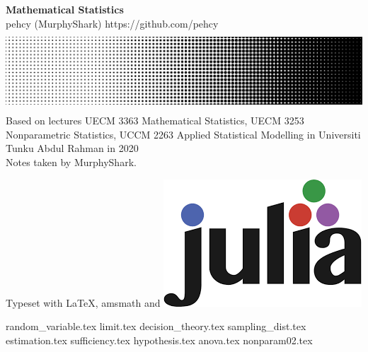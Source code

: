 \documentclass[11pt,twoside]{report}
\begin{document}
\begin{titlepage}
  \centering
  \vfill
  {\Large
      \textbf{Mathematical Statistics}\\
      \vskip2cm
      pehcy (MurphyShark) \quad \textsf{https://github.com/pehcy} \\
  }    
  \vfill
  \includegraphics[width=0.8\paperwidth, height=3cm]{./src/images/HalftoneGradient.png} %
  \vskip2cm
  {
    Based on lectures UECM 3363 Mathematical Statistics, UECM 3253 Nonparametric Statistics, UCCM 2263 Applied Statistical Modelling in Universiti Tunku Abdul Rahman in 2020\\
    Notes taken by MurphyShark.
  }
  \vfill
  \begin{flushleft}
    \footnotesize Typeset with \LaTeX, amsmath and \includegraphics[scale=0.06, height=3ex]{./src/images/Julia.png}
  \end{flushleft}
\end{titlepage}
{random_variable.tex}
{limit.tex}
{decision_theory.tex}
{sampling_dist.tex}
{estimation.tex}
{sufficiency.tex}
{hypothesis.tex}
{anova.tex}
{nonparam02.tex}
\end{document}
